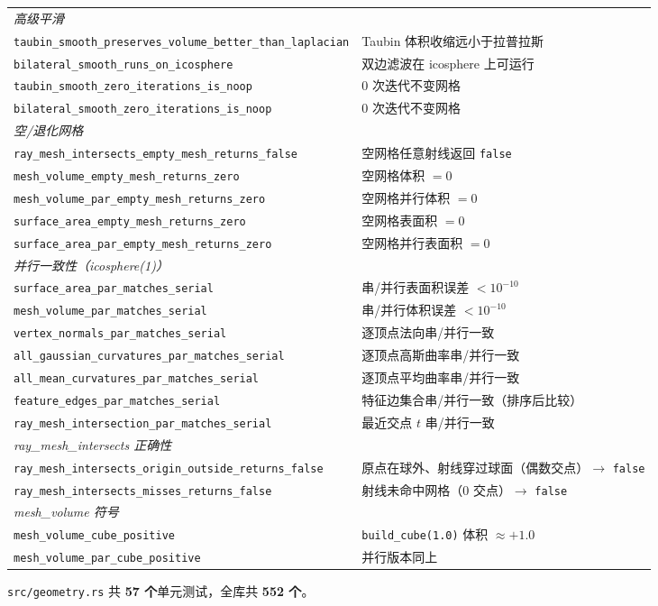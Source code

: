 \documentclass[11pt,a4paper]{article}
\begin{document}
\begin{center}
\begin{tabular}{@{}ll@{}}
  \midrule
  \multicolumn{2}{l}{\textit{高级平滑}} \\
  \texttt{taubin\_smooth\_preserves\_volume\_better\_than\_laplacian} & Taubin 体积收缩远小于拉普拉斯 \\
  \texttt{bilateral\_smooth\_runs\_on\_icosphere}   & 双边滤波在 icosphere 上可运行 \\
  \texttt{taubin\_smooth\_zero\_iterations\_is\_noop} & 0 次迭代不变网格 \\
  \texttt{bilateral\_smooth\_zero\_iterations\_is\_noop} & 0 次迭代不变网格 \\
  \midrule
  \multicolumn{2}{l}{\textit{空/退化网格}} \\
  \texttt{ray\_mesh\_intersects\_empty\_mesh\_returns\_false} & 空网格任意射线返回 \texttt{false} \\
  \texttt{mesh\_volume\_empty\_mesh\_returns\_zero} & 空网格体积 $= 0$ \\
  \texttt{mesh\_volume\_par\_empty\_mesh\_returns\_zero} & 空网格并行体积 $= 0$ \\
  \texttt{surface\_area\_empty\_mesh\_returns\_zero} & 空网格表面积 $= 0$ \\
  \texttt{surface\_area\_par\_empty\_mesh\_returns\_zero} & 空网格并行表面积 $= 0$ \\
  \midrule
  \multicolumn{2}{l}{\textit{并行一致性（icosphere(1)）}} \\
  \texttt{surface\_area\_par\_matches\_serial} & 串/并行表面积误差 $< 10^{-10}$ \\
  \texttt{mesh\_volume\_par\_matches\_serial} & 串/并行体积误差 $< 10^{-10}$ \\
  \texttt{vertex\_normals\_par\_matches\_serial} & 逐顶点法向串/并行一致 \\
  \texttt{all\_gaussian\_curvatures\_par\_matches\_serial} & 逐顶点高斯曲率串/并行一致 \\
  \texttt{all\_mean\_curvatures\_par\_matches\_serial} & 逐顶点平均曲率串/并行一致 \\
  \texttt{feature\_edges\_par\_matches\_serial} & 特征边集合串/并行一致（排序后比较） \\
  \texttt{ray\_mesh\_intersection\_par\_matches\_serial} & 最近交点 $t$ 串/并行一致 \\
  \midrule
  \multicolumn{2}{l}{\textit{ray\_mesh\_intersects 正确性}} \\
  \texttt{ray\_mesh\_intersects\_origin\_outside\_returns\_false} & 原点在球外、射线穿过球面（偶数交点）$\to$ \texttt{false} \\
  \texttt{ray\_mesh\_intersects\_misses\_returns\_false} & 射线未命中网格（0 交点）$\to$ \texttt{false} \\
  \midrule
  \multicolumn{2}{l}{\textit{mesh\_volume 符号}} \\
  \texttt{mesh\_volume\_cube\_positive} & \texttt{build\_cube(1.0)} 体积 $\approx +1.0$ \\
  \texttt{mesh\_volume\_par\_cube\_positive} & 并行版本同上 \\
  \bottomrule
\end{tabular}
\end{center}

\texttt{src/geometry.rs} 共 \textbf{57 个}单元测试，全库共 \textbf{552 个}。
\end{document}
